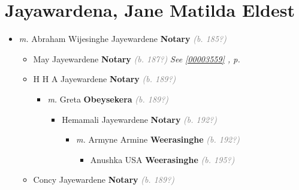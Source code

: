 \documentclass[10pt, openany]{book}
\begin{document}
\chapter{Jayawardena, Jane Matilda Eldest}
\label{00003551}
\textcolor{slmaroon}{\textit{}}
\begin{itemize}
\item{\textit{m.} Abraham Wijesinghe Jayewardene \textbf{Notary} \textcolor{gray}{\textit{(b. 185?)}}   \label{couple:00003551:00003552} \begin{itemize}
\item{May Jayewardene \textbf{Notary} \textcolor{gray}{\textit{(b. 187?)}} \textcolor{slteal}{\textit{See  \autoref{00003559} \textit{, p. \pageref{00003559} }}}}
\item{H H A Jayewardene \textbf{Notary} \textcolor{gray}{\textit{(b. 189?)}}
\begin{itemize}
\item{\textit{m.} Greta \textbf{Obeysekera} \textcolor{gray}{\textit{(b. 189?)}}   \label{couple:00003554:00003555} \begin{itemize}
\item{Hemamali Jayewardene \textbf{Notary} \textcolor{gray}{\textit{(b. 192?)}}
\begin{itemize}
\item{\textit{m.} Armyne Armine \textbf{Weerasinghe} \textcolor{gray}{\textit{(b. 192?)}}   \label{couple:00003556:00003557} \begin{itemize}
\item{Anushka  USA \textbf{Weerasinghe} \textcolor{gray}{\textit{(b. 195?)}}
  }
\end{itemize}}
\end{itemize}
  }
\end{itemize}}
\end{itemize}
    }
\item{Concy Jayewardene \textbf{Notary} \textcolor{gray}{\textit{(b. 189?)}}
  }
\end{itemize}}
\end{itemize}
   
\end{document}
